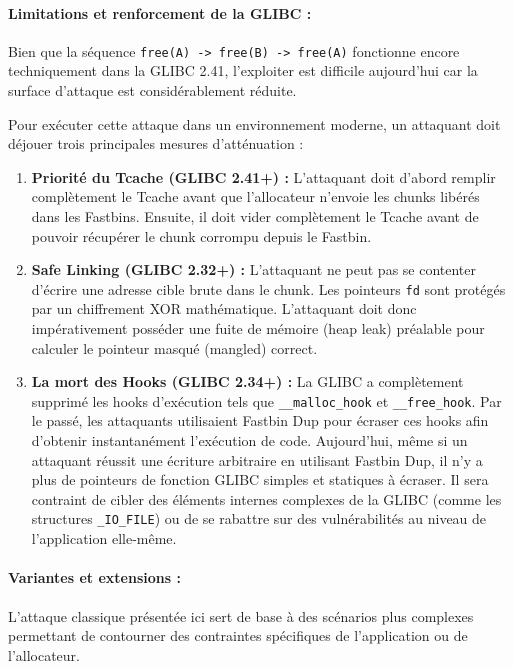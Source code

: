 \paragraph{Limitations et renforcement de la GLIBC :}
Bien que la séquence \texttt{free(A) -> free(B) -> free(A)} fonctionne encore techniquement dans la GLIBC 2.41, l'exploiter est difficile aujourd'hui car la surface d'attaque est considérablement réduite.

Pour exécuter cette attaque dans un environnement moderne, un attaquant doit déjouer trois principales mesures d'atténuation :
\begin{enumerate}
    \item \textbf{Priorité du Tcache (GLIBC 2.41+) :} L'attaquant doit d'abord remplir complètement le Tcache avant que l'allocateur n'envoie les chunks libérés dans les Fastbins. Ensuite, il doit vider complètement le Tcache avant de pouvoir récupérer le chunk corrompu depuis le Fastbin.
    \item \textbf{Safe Linking (GLIBC 2.32+) :} L'attaquant ne peut pas se contenter d'écrire une adresse cible brute dans le chunk. Les pointeurs \texttt{fd} sont protégés par un chiffrement XOR mathématique. L'attaquant doit donc impérativement posséder une fuite de mémoire (heap leak) préalable pour calculer le pointeur masqué (mangled) correct.
    \item \textbf{La mort des Hooks (GLIBC 2.34+) :} La GLIBC a complètement supprimé les hooks d'exécution tels que \texttt{\_\_malloc\_hook} et \texttt{\_\_free\_hook}. Par le passé, les attaquants utilisaient Fastbin Dup pour écraser ces hooks afin d'obtenir instantanément l'exécution de code. Aujourd'hui, même si un attaquant réussit une écriture arbitraire en utilisant Fastbin Dup, il n'y a plus de pointeurs de fonction GLIBC simples et statiques à écraser. Il sera contraint de cibler des éléments internes complexes de la GLIBC (comme les structures \texttt{\_IO\_FILE}) ou de se rabattre sur des vulnérabilités au niveau de l'application elle-même.
\end{enumerate}

\paragraph{Variantes et extensions :}
L'attaque classique présentée ici sert de base à des scénarios plus complexes permettant de contourner des contraintes spécifiques de l'application ou de l'allocateur.

